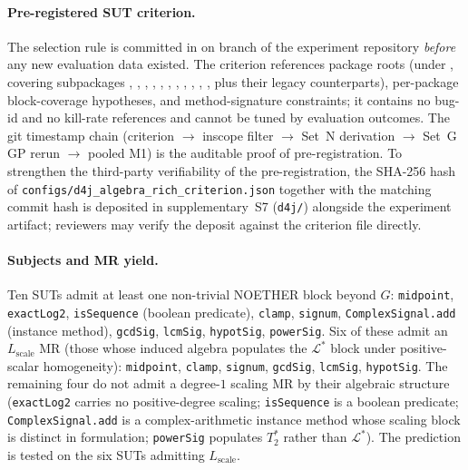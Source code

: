 \documentclass[manuscript]{acmart}
\begin{document}
\paragraph{Pre-registered SUT criterion.}
The selection rule is committed in
 on branch
 of the experiment repository
\emph{before} any new evaluation data existed. The criterion
references package roots (under , covering subpackages , , , , , , , , , , , plus their  legacy counterparts), per-package
block-coverage hypotheses, and method-signature constraints; it
contains no bug-id and no kill-rate references and cannot be tuned by
evaluation outcomes. The git timestamp chain (criterion
$\rightarrow$ inscope filter $\rightarrow$ Set~N derivation
$\rightarrow$ Set~G GP rerun $\rightarrow$ pooled M1) is the
auditable proof of pre-registration. To strengthen the third-party
verifiability of the pre-registration, the SHA-256 hash of
\texttt{configs/d4j\_algebra\_rich\_criterion.json} together with
the matching commit hash is deposited in supplementary~S7 (\texttt{d4j/})
alongside the experiment artifact; reviewers may verify the deposit
against the criterion file directly.

\paragraph{Subjects and MR yield.}
Ten SUTs admit at least one non-trivial NOETHER block beyond $G$:
\texttt{midpoint}, \texttt{exactLog2}, \texttt{isSequence} (boolean
predicate), \texttt{clamp}, \texttt{signum},
\texttt{ComplexSignal.add} (instance method), \texttt{gcdSig},
\texttt{lcmSig}, \texttt{hypotSig}, \texttt{powerSig}. Six of these
admit an $L_{\mathrm{scale}}$ MR (those whose induced algebra
populates the $\mathcal{L}^{*}$ block under positive-scalar
homogeneity): \texttt{midpoint}, \texttt{clamp}, \texttt{signum},
\texttt{gcdSig}, \texttt{lcmSig}, \texttt{hypotSig}. The remaining
four do not admit a degree-$1$ scaling MR by their algebraic structure
(\texttt{exactLog2} carries no positive-degree scaling;
\texttt{isSequence} is a boolean predicate; \texttt{ComplexSignal.add}
is a complex-arithmetic instance method whose scaling block is
distinct in formulation; \texttt{powerSig} populates $T^{*}_{2}$
rather than $\mathcal{L}^{*}$). The prediction is tested on the six
SUTs admitting $L_{\mathrm{scale}}$.
\end{document}
